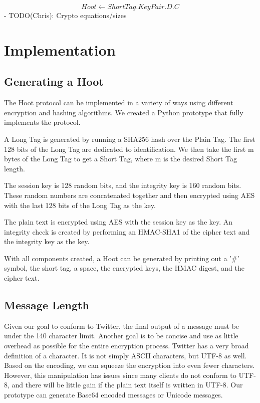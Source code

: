 \documentclass{acm_proc_article-sp}
\begin{document}
\begin{equation}
	Hoot \leftarrow ShortTag.KeyPair.D.C
\end{equation}
- TODO(Chris): Crypto equations/sizes

\section{Implementation}

\subsection{Generating a Hoot}

The Hoot protocol can be implemented in a variety of ways using different encryption and hashing algorithms. We created a Python prototype that fully implements the protocol.

A Long Tag is generated by running a SHA256 hash over the Plain Tag. The first 128 bits of the Long Tag are dedicated to identification. We then take the first m bytes of the Long Tag to get a Short Tag, where m is the desired Short Tag length.

The session key is 128 random bits, and the integrity key is 160 random bits. These random numbers are concatenated together and then encrypted using AES with the last 128 bits of the Long Tag as the key.

The plain text is encrypted using AES with the session key as the key. An integrity check is created by performing an HMAC-SHA1 of the cipher text and the integrity key as the key.

With all components created, a Hoot can be generated by printing out a '\#' symbol,  the short tag, a space, the encrypted keys, the HMAC digest, and the cipher text.

\subsection{Message Length}

Given our goal to conform to Twitter, the final output of a message must be under the 140 character limit. Another goal is to be concise and use as little overhead as possible for the entire encryption process. Twitter has a very broad definition of a character. It is not simply ASCII characters, but UTF-8 as well. Based on the encoding, we can squeeze the encryption into even fewer characters. However, this manipulation has issues since many clients do not conform to UTF-8, and there will be little gain if the plain text itself is written in UTF-8. Our prototype can generate Base64 encoded messages or Unicode messages.
\end{document}

